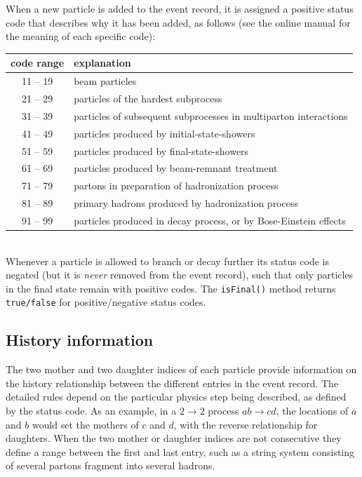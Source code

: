 \documentclass[12pt,a4paper]{article}
\begin{document}
When a new particle is added to the event record, it is assigned 
a positive status code that describes why it has been added,
as follows (see the online manual for the meaning of each specific
code):\\[2mm]  
\begin{tabular}{|c|l|}
\hline
code range & explanation \\
\hline
11 -- 19 & beam particles\\
21 -- 29 & particles of the hardest subprocess\\
31 -- 39 & particles of subsequent subprocesses in multiparton interactions\\
41 -- 49 & particles produced by initial-state-showers\\
51 -- 59 & particles produced by final-state-showers\\
61 -- 69 & particles produced by beam-remnant treatment\\
71 -- 79 & partons in preparation of hadronization process\\
81 -- 89 & primary hadrons produced by hadronization process\\
91 -- 99 & particles produced in decay process, or by Bose-Einstein effects\\ 
\hline
\end{tabular}\\[2mm]
Whenever a particle is allowed to branch or decay further its status 
code is negated (but it is \textit{never} removed from the event record), 
such that only particles in the final state remain with positive codes. The
\texttt{isFinal()} method returns \texttt{true/false} for
positive/negative status codes.

\subsection{History information}

The two mother and two daughter indices of each particle provide 
information on the history relationship between the different entries 
in the event record. The detailed rules depend on the particular physics 
step being described, as defined by the status code. As an example, 
in a $2 \to 2$ process $a b \to c d$, the locations of $a$ and $b$
would set the mothers of $c$ and $d$, with the reverse relationship
for daughters. When the two mother or daughter indices are not
consecutive they define a range between the first and last entry,
such as a string system consisting of several partons fragment into
several hadrons.
\end{document}
